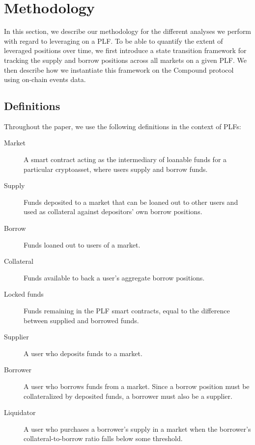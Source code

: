 \section{Methodology}
\label{sec:methodology}

In this section, we describe our methodology for the different analyses we perform with regard to leveraging on a PLF.
To be able to quantify the extent of leveraged positions over time, we first introduce a state transition framework for tracking the supply and borrow positions across all markets on a given PLF.
We then describe how we instantiate this framework on the Compound protocol using on-chain events data.

\subsection{Definitions}

Throughout the paper, we use the following definitions in the context of PLFs:

\begin{description}
\item[Market] A smart contract acting as the intermediary of loanable funds for a particular cryptoasset, where users supply and borrow funds. 

\item[Supply] Funds deposited to a market that can be loaned out to other users and used as collateral against depositors' own borrow positions.

\item[Borrow] Funds loaned out to users of a market.

\item[Collateral] Funds available to back a user's aggregate borrow positions.

\item[Locked funds] Funds remaining in the PLF smart contracts, equal to the difference between supplied and borrowed funds.

\item[Supplier] A user who deposits funds to a market.

\item[Borrower] A user who borrows funds from a market. Since a borrow position must be collateralized by deposited funds, a borrower must also be a supplier.

\item[Liquidator] A user who purchases a borrower's supply in a market when the borrower's collateral-to-borrow ratio falls below some threshold.
\end{description}


